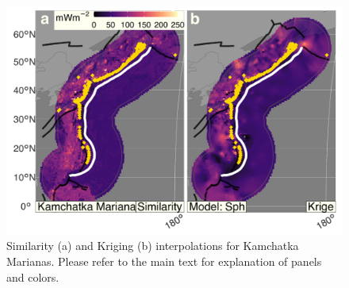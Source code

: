 \begin{figure}[htbp]

{\centering \includegraphics[width=1\linewidth,]{assets/figs/chpt3/KamchatkaMarianasDiffComp} 

}

\caption[Similarityand Kriging interpolations for Kamchatka Marianas]{Similarity (a) and Kriging (b) interpolations for Kamchatka Marianas. Please refer to the main text for explanation of panels and colors.}\label{fig:kamchatkaMarianasDiff}
\end{figure}

